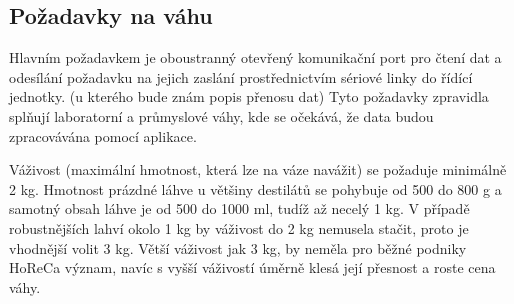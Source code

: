 \subsection{Požadavky na váhu}

Hlavním požadavkem je oboustranný otevřený komunikační port pro čtení dat a odesílání požadavku na jejich zaslání prostřednictvím sériové linky do řídící jednotky. (u kterého bude znám popis přenosu dat) Tyto požadavky zpravidla splňují laboratorní a průmyslové váhy, kde se očekává, že data budou zpracovávána pomocí aplikace.

Váživost (maximální hmotnost, která lze na váze navážit) se požaduje minimálně 2 kg. Hmotnost prázdné láhve u většiny destilátů se pohybuje od 500 do 800 g a samotný obsah láhve je od 500 do 1000 ml, tudíž až necelý 1 kg. V případě robustnějších lahví okolo 1 kg by váživost do 2 kg nemusela stačit, proto je vhodnější volit 3 kg. Větší váživost jak 3 kg, by neměla pro běžné podniky HoReCa význam, navíc s vyšší váživostí úměrně klesá její přesnost a roste cena váhy.

